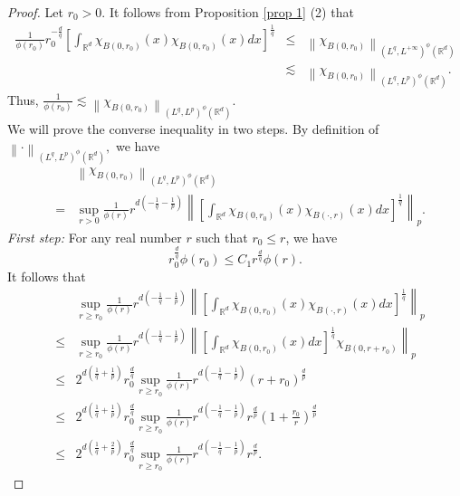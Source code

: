\documentclass[10pt,a4paper]{amsart}
\begin{document}
\begin{proof}
Let $ r_{0} >0. $ It follows from Proposition \ref{prop 1} (2) that 
\begin{eqnarray*}
 \frac{1}{\phi(r_{0})} r_{0}^{-\frac{d}{q}} \left[\int_{\mathbb R^{d}} \chi_{B(0,r_{0})}(x)\chi_{B(0,r_{0})}(x)dx\right]^{\frac{1}{q}} &\leq &         \left\|\chi_{B(0,r_{0})} \right\|_{(L^{q},L^{+\infty})^{\phi}(\mathbb{R}^{d})}\\
 & \lesssim & \left\|\chi_{B(0,r_{0})}\right\|_{(L^{q},L^{p})^{\phi}(\mathbb{R}^{d})}.
\end{eqnarray*}
Thus, $ \frac{1}{\phi(r_{0})} \lesssim \left\| \chi_{B(0,r_{0})} \right\|_{(L^{q},L^{p})^{\phi }(\mathbb{R}^{d})}. $\\
We will prove the converse inequality in two steps. By definition of $\left\| \cdot \right\|_{(L^{q},L^{p})^{\phi }(\mathbb{R}^{d})},$ we have 
\begin{eqnarray*}
&&\left\| \chi_{B(0,r_{0})} \right\|_{(L^{q},L^{p})^{\phi }(\mathbb{R}^{d})} \\&=& \sup_{r>0} \frac{1}{\phi(r)} r^{d(-\frac{1}{q}-\frac{1}{p})} \left\|\left[\int_{\mathbb R^{d}} \chi_{B(0,r_{0})}(x)\chi_{B(\cdot,r)}(x)dx\right]^{\frac{1}{q}}\right\|_p. 
\end{eqnarray*}
\textit{First step:} For any real number $r$ such that $ r_{0} \leq r  $, we have
\begin{equation} \label{eqq 1}
r_{0}^{\frac{d}{q}}\phi(r_{0}) \leq C_{1} r^{\frac{d}{q}}\phi(r).
\end{equation}
It follows that
\begin{eqnarray*}
&&\sup_{r \ge r_{0}} \frac{1}{\phi(r)} r^{d(-\frac{1}{q}-\frac{1}{p})} \left\|\left[\int_{\mathbb R^{d}}  \chi_{B(0,r_{0})}(x)\chi_{B(\cdot,r)}(x)dx\right]^{\frac{1}{q}}\right\|_p \\&\leq& \sup_{r \ge r_{0}} \frac{1}{\phi(r)} r^{d(-\frac{1}{q}-\frac{1}{p})} \left\|\left[\int_{\mathbb R^{d}}  \chi_{B(0,r_{0})}(x)dx\right]^{\frac{1}{q}}\chi_{B(0,r+r_{0})}\right\|_p \\&\leq& 
 2^{d(\frac{1}{q}+\frac{1}{p})}
r^{\frac{d}{q}}_{0}\sup_{r \ge r_{0}} \frac{1}{\phi(r)} r^{d(-\frac{1}{q}-\frac{1}{p})} (r+r_{0})^{\frac{d}{p}}\\
&\leq& 2^{d(\frac{1}{q}+\frac{1}{p})}r^{\frac{d}{q}}_{0}\sup_{r \ge r_{0}} \frac{1}{\phi(r)} r^{d(-\frac{1}{q}-\frac{1}{p})} r^{\frac{d}{p}}(1+\frac{r_{0}}{r})^{\frac{d}{p}} \\
&\leq& 2^{d(\frac{1}{q}+\frac{2}{p})}r^{\frac{d}{q}}_{0}\sup_{r \ge r_{0}} \frac{1}{\phi(r)} r^{d(-\frac{1}{q}-\frac{1}{p})} r^{\frac{d}{p}}.

\end{eqnarray*}
\end{proof}
\end{document}
